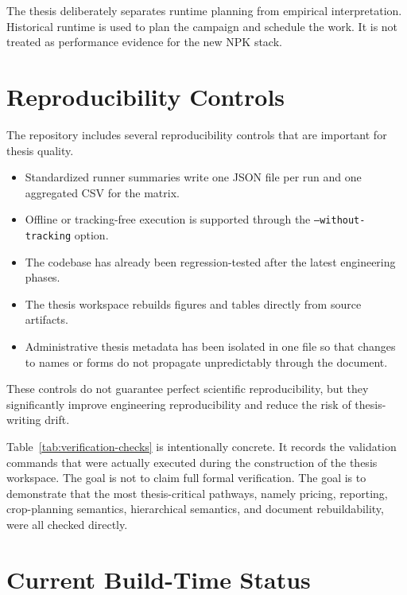 

The thesis deliberately separates runtime planning from empirical interpretation. Historical runtime is used to plan the campaign and schedule the work. It is not treated as performance evidence for the new NPK stack.

\section{Reproducibility Controls}

The repository includes several reproducibility controls that are important for thesis quality.
\begin{itemize}[leftmargin=1.2cm]
    \item Standardized runner summaries write one JSON file per run and one aggregated CSV for the matrix.
    \item Offline or tracking-free execution is supported through the \texttt{--without-tracking} option.
    \item The codebase has already been regression-tested after the latest engineering phases.
    \item The thesis workspace rebuilds figures and tables directly from source artifacts.
    \item Administrative thesis metadata has been isolated in one file so that changes to names or forms do not propagate unpredictably through the document.
\end{itemize}

These controls do not guarantee perfect scientific reproducibility, but they significantly improve engineering reproducibility and reduce the risk of thesis-writing drift.



Table~\ref{tab:verification-checks} is intentionally concrete. It records the validation commands that were actually executed during the construction of the thesis workspace. The goal is not to claim full formal verification. The goal is to demonstrate that the most thesis-critical pathways, namely pricing, reporting, crop-planning semantics, hierarchical semantics, and document rebuildability, were all checked directly.

\section{Current Build-Time Status}


